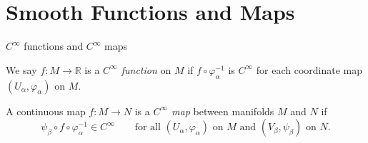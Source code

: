 \documentclass[10pt]{beamer}
\newcommand{\R}{\mathbb{R}}
\begin{document}
\section{Smooth Functions and Maps}

\begin{frame}{$C^\infty$ functions and $C^\infty$ maps}
	\begin{definition}
		We say $f: M \to \R$ is a \emph{$C^\infty$ function} on $M$ if
		$f \circ \varphi_\alpha^{-1}$ is $C^\infty$ for each coordinate map
		$(U_\alpha, \varphi_\alpha)$ on $M$.
		\par\medskip
		A continuous map $f: M \to N$ is a \emph{$C^\infty$ map} between
		manifolds $M$ and $N$ if
		\[
			\psi_\beta \circ f \circ \varphi_\alpha^{-1} \in C^\infty
			\qquad \text{for all } (U_\alpha, \varphi_\alpha)
			\text{ on } M \text{ and } (V_\beta, \psi_\beta) \text{ on } N .
		\]
	\end{definition}
\end{frame}
\end{document}
